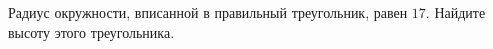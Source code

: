 \begin{ex}
	\begin{condition}
		Радиус окружности, вписанной в правильный треугольник, равен \( 17 \). Найдите высоту этого треугольника.
	\end{condition}
\end{ex}